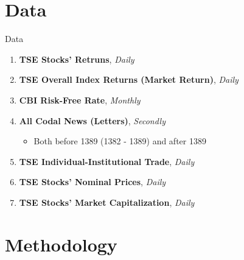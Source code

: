 \documentclass{beamer}
\begin{document}








\section{Data}



\begin{frame}{Data}

    \begin{enumerate}
        \item \textbf{TSE Stocks' Retruns}, \textit{Daily}
        \item \textbf{TSE Overall Index Returns (Market Return)}, \textit{Daily}
        \item \textbf{CBI Risk-Free Rate}, \textit{Monthly}
        \item \textbf{All Codal News (Letters)}, \textit{Secondly}
              \begin{itemize}
                  \item Both before 1389 (1382 - 1389) and after 1389
              \end{itemize}
        \item \textbf{TSE Individual-Institutional Trade}, \textit{Daily}
        \item \textbf{TSE Stocks' Nominal Prices}, \textit{Daily}
        \item \textbf{TSE Stocks' Market Capitalization}, \textit{Daily}
    \end{enumerate}

\end{frame}



\section{Methodology}


\end{document}
